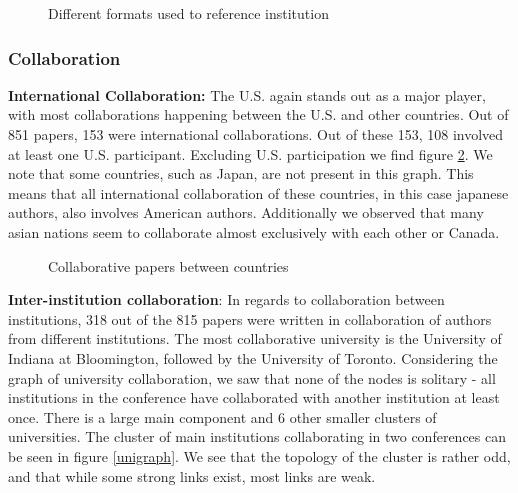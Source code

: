 \documentclass[article,twocolumn]{IEEEtran}
\begin{document}
    \begin{figure}
        \begin{center}\end{center}
        \caption{Different formats used to reference institution}
        \label{figrep}
    \end{figure}
    
    \hypertarget{collaboration}{%
\subsubsection{Collaboration}\label{collaboration}}

\textbf{International Collaboration:} The U.S. again stands out as a
major player, with most collaborations happening between the U.S. and
other countries. Out of 851 papers, 153 were international
collaborations. Out of these 153, 108 involved at least one U.S.
participant. Excluding U.S. participation we find figure
\ref{figcollab}. We note that some countries, such as Japan, are not
present in this graph. This means that all international collaboration
of these countries, in this case japanese authors, also involves
American authors. Additionally we observed that many asian nations seem
to collaborate almost exclusively with each other or Canada.


    \begin{figure}
        \begin{center}\end{center}
        \caption{Collaborative papers between countries}
        \label{figcollab}
    \end{figure}
    
    \textbf{Inter-institution collaboration}: In regards to collaboration
between institutions, 318 out of the 815 papers were written in
collaboration of authors from different institutions. The most
collaborative university is the University of Indiana at Bloomington,
followed by the University of Toronto. Considering the graph of
university collaboration, we saw that none of the nodes is solitary -
all institutions in the conference have collaborated with another
institution at least once. There is a large main component and 6 other
smaller clusters of universities. The cluster of main institutions
collaborating in two conferences can be seen in figure \ref{unigraph}.
We see that the topology of the cluster is rather odd, and that while
some strong links exist, most links are weak.
\end{document}
